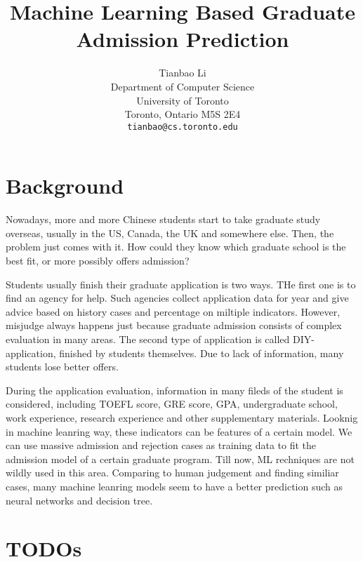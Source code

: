 \documentclass{article}
\title{Machine Learning Based Graduate Admission Prediction}
\author{
  Tianbao Li\\
  Department of Computer Science\\
  University of Toronto\\
  Toronto, Ontario M5S 2E4\\
  \texttt{tianbao@cs.toronto.edu} \\
}
\begin{document}

\maketitle


\section{Background}

Nowadays, more and more Chinese students start to take graduate study overseas, usually in the US, Canada, the UK and somewhere else. Then, the problem just comes with it. How could they know which graduate school is the best fit, or more possibly offers admission?

Students usually finish their graduate application is two ways. THe first one is to find an agency for help. Such agencies collect application data for year and give advice based on history cases and percentage on miltiple indicators. However, misjudge always happens just because graduate admission consists of complex evaluation in many areas. The second type of application is called DIY-application, finished by students themselves. Due to lack of information, many students lose better offers.

During the application evaluation, information in many fileds of the student is considered, including TOEFL score, GRE score, GPA, undergraduate school, work experience, research experience and other supplementary materials. Looknig in machine leanring way, these indicators can be features of a certain model. We can use massive admission and rejection cases as training data to fit the admission model of a certain graduate program. Till now, ML rechniques are not wildly used in this area. Comparing to human judgement and finding similiar cases, many machine leanring models seem to have a better prediction such as neural networks and decision tree.

\section{TODOs}
\end{document}
